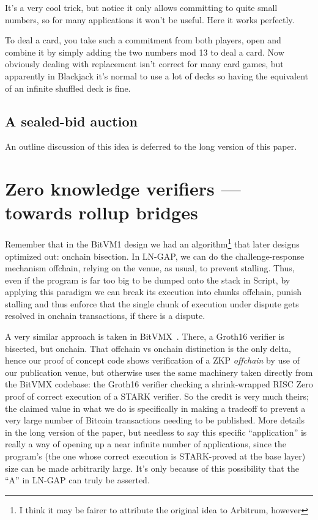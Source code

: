 \documentclass[11pt]{article}
\begin{document}
It's a very cool trick, but notice it only allows committing to quite small numbers, so for many applications it won't be useful. Here it works perfectly.

To deal a card, you take such a commitment from both players, open and combine it by simply adding the two numbers mod 13 to deal a card. Now obviously dealing with replacement isn't correct for many card games, but apparently in Blackjack it's normal to use a lot of decks so having the equivalent of an infinite shuffled deck is fine.

\subsection{A sealed-bid auction}
\label{sec:auction}

An outline discussion of this idea is deferred to the long version of this paper.

\section{Zero knowledge verifiers --- towards rollup bridges}
\label{sec:zk}

Remember that in the BitVM1 design we had an algorithm\footnote{I think it may be fairer to attribute the original idea to Arbitrum, however} that later designs optimized out: onchain bisection. In LN-GAP, we can do the challenge-response mechanism offchain, relying on the venue, as usual, to prevent stalling. Thus, even if the program is far too big to be dumped onto the stack in Script, by applying this paradigm we can break its execution into chunks offchain, punish stalling and thus enforce that the single chunk of execution under dispute gets resolved in onchain transactions, if there is a dispute.

A very similar approach is taken in BitVMX~\cite{bitvmx}. There, a Groth16 verifier is bisected, but onchain. That offchain vs onchain distinction is the only delta, hence our proof of concept code shows verification of a ZKP \emph{offchain} by use of our publication venue, but otherwise uses the same machinery taken directly from the BitVMX codebase: the Groth16 verifier checking a shrink-wrapped RISC Zero proof of correct execution of a STARK verifier. So the credit is very much theirs; the claimed value in what we do is specifically in making a tradeoff to prevent a very large number of Bitcoin transactions needing to be published. More details in the long version of the paper, but needless to say this specific ``application'' is really a way of opening up a near infinite number of applications, since the program's (the one whose correct execution is STARK-proved at the base layer) size can be made arbitrarily large. It's only because of this possibility that the ``A'' in LN-GAP can truly be asserted.
\end{document}
